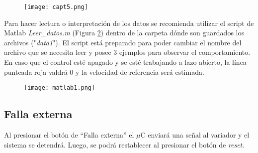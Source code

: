 \begin{figure}[H]
	\centering
	\texttt{[image: capt5.png]}
	\label{fig:capt5}
\end{figure}
Para hacer lectura o interpretación de los datos se recomienda utilizar el script de Matlab \textit{Leer\_datos.m} (Figura \ref{fig:matlab1}) dentro de la carpeta dónde son guardados los archivos ("\textit{data1}"). El script está preparado para poder cambiar el nombre del archivo que se necesita leer y posee 3 ejemplos para observar el comportamiento.\\ En caso que el control esté apagado y se esté trabajando a lazo abierto, la línea punteada roja valdrá 0 y la velocidad de referencia será estimada.

\begin{figure}[H]
	\centering
	\texttt{[image: matlab1.png]}
	\label{fig:matlab1}
\end{figure}

\subsection{Falla externa}
	Al presionar el botón de “Falla externa” el $\mu$C enviará una señal al variador y el sistema se detendrá. Luego, se podrá restablecer al presionar el botón de \textit{reset}.

\newpage





